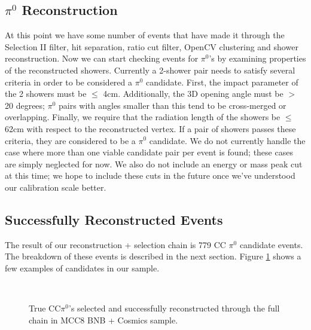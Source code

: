 \documentclass[12pt]{article}
\begin{document}
\subsection{$\pi^0$ Reconstruction}
\label{sec:pi0reco}
At this point we have some number of events that have made it through the Selection II filter, hit separation, ratio cut filter, OpenCV clustering and shower reconstruction. Now we can start checking events for $\pi^0$'s by examining properties of the reconstructed showers.  Currently a 2-shower pair needs to satisfy several criteria in order to be considered a $\pi^0$ candidate. First, the impact parameter of the 2 showers must be $\leq$ 4cm.  Additionally, the 3D opening angle must be $>$ 20 degrees; $\pi^0$ pairs with angles smaller than this tend to be cross-merged or overlapping. Finally, we require that the radiation length of the showers be $\leq$ 62cm with respect to the reconstructed vertex. If a pair of showers passes these criteria, they are considered to be a $\pi^0$ candidate. We do not currently handle the case where more than one viable candidate pair per event is found; these cases are simply neglected for now. We also do not include an energy or mass peak cut at this time; we hope to include these cuts in the future once we've understood our calibration scale better.

\subsection{Successfully Reconstructed Events}
The result of our reconstruction + selection chain is 779 CC $\pi^0$ candidate events. The breakdown of these events is described in the next section. Figure \ref{fig:ex2} shows a few examples of candidates in our sample. %

\begin{figure}[h!]
\centering
\label{fig:ex2}
\hspace{1 mm}
\\
\vspace{1 mm}
\hspace{1 mm}
{}
\hspace{1 mm}
\caption{True CC$\pi^0$'s selected and successfully reconstructed through the full chain in MCC8 BNB + Cosmics sample. }
\label{fig:ex2}
\end{figure}
\end{document}
